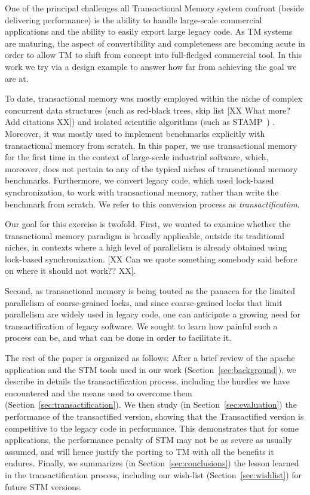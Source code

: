 \documentclass[preprint,natbib,11pt]{sigplanconf}
\begin{document}
One of the principal challenges all Transactional Memory system confront (beside 
delivering performance) is the ability to handle large-scale commercial applications and the 
ability to easily export  large legacy code. As TM systems are maturing, the aspect of 
convertibility and completeness are becoming acute in order to allow TM to shift from concept 
into full-fledged commercial tool. In this work we try via a design example to answer how 
far from achieving the goal we are at. 

To date, transactional memory was mostly employed within the niche of complex concurrent data 
structures (such as red-black trees, skip list  [XX What more? Add citations XX]) and 
isolated scientific algorithms (such as STAMP~\cite{caominh:stamp:iiswc:2008}) . Moreover, it was mostly 
used to implement benchmarks explicitly with transactional memory from scratch. In this paper, 
we use transactional memory for the first time in the context of large-scale industrial 
software, which, moreover, does not pertain to any of the typical niches of transactional 
memory benchmarks. Furthermore, we convert legacy code, which used lock-based synchronization, 
to work with transactional memory, rather than write the benchmark from scratch. We refer to 
this conversion process as \emph{transactification}.

Our goal for this exercise is twofold. First, we wanted to examine whether the transactional 
memory paradigm is broadly applicable, outside its traditional niches, in contexts where a 
high level of parallelism is already obtained using lock-based synchronization. [XX Can we 
quote something somebody said before on where it should not work?? XX]. 

Second, as transactional memory is being touted as the panacea for the limited parallelism 
of coarse-grained locks, and since coarse-grained locks that limit parallelism are widely used 
in legacy code, one can anticipate a growing need for transactification of legacy software. 
We sought to learn how painful such a process can be, and what can be done in order to 
facilitate it.

The rest of the paper is organized as follows: After a brief review of the apache application 
and the STM tools used in our work (Section~\ref{sec:background}), we describe in details the
transactification process, including the hurdles we have encountered and the means used to overcome
them (Section~\ref{sec:transactification}). We then study (in Section~\ref{sec:evaluation}) the
performance of the transactified version, showing that the Transactified version is competitive to
the legacy code in performance. This demonstrates that for some applications, the performance
penalty of STM may not be as severe as usually assumed, and will hence justify the porting to TM
with all the benefits it endures. Finally, we summarizes (in Section~\ref{sec:conclusions}) the
lesson learned in the transactification process, including our wish-list
(Section~\ref{sec:wishlist}) for future STM versions.
\end{document}
